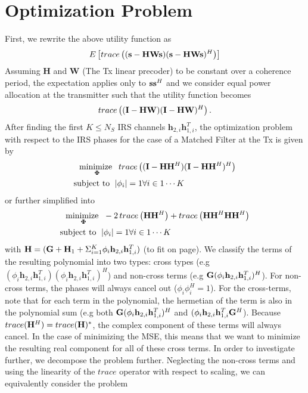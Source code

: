 \documentclass[12pt,a4paper]{report}
\begin{document}
\section{Optimization Problem}
First, we rewrite the above utility function as
	\begin{equation}
E\left[ \mathop{trace}\left((\mathbf{s} - \mathbf{H}\mathbf{W}\mathbf{s})(\mathbf{s} - \mathbf{H}\mathbf{W}\mathbf{s})^H \right)\right]
\end{equation}
Assuming $\mathbf{H}$ and $\mathbf{W}$ (The Tx linear precoder) to be constant over a coherence period, the expectation applies only to $\mathbf{s} \mathbf{s}^H$ 
and we consider equal power allocation at the transmitter such that the utility function becomes
	\begin{equation}
\mathop{trace}\left((\mathbf{I} - \mathbf{H}\mathbf{W})(\mathbf{I} - \mathbf{H}\mathbf{W})^H \right).
\end{equation}
After finding the first $K \leq N_S$ IRS channels $\mathbf{h}_{2,i}\mathbf{h}^T_{1,i}$, the optimization problem with respect to the IRS phases for the case of a Matched Filter at the Tx is given by
	\begin{align}
	    \underset{\boldsymbol{\Phi}}{\text{minimize }}
	    & \; \mathop{trace}\left((\mathbf{I} - \mathbf{H}\mathbf{H}^H)
	   (\mathbf{I} - \mathbf{H}\mathbf{H}^H)^H \right)
	     \\
	    \text{subject to  } \; &
	    | \phi_i | = 1  \forall i \in {1 \cdots	 K}
	\end{align}\label{mse_problem}
	or further simplified into
		\begin{align}
	    \underset{\boldsymbol{\Phi}}{\text{minimize }}
	    & \; - 2 \mathop{trace} \left( \mathbf{H}\mathbf{H}^H\right) + \mathop{trace}\left(\mathbf{H}\mathbf{H}^H \mathbf{H}\mathbf{H}^H\right)
	     \\
	    \text{subject to  } \; &
	    | \phi_i | = 1  \forall i \in {1 \cdots	 K}
	\end{align}\label{mse_problem_s}
	with $\mathbf{H} = (\mathbf{G} +  \mathbf{H}_1 + \Sigma_{i=1}^{K} \phi_i \mathbf{h}_{2,i}\mathbf{h}^T_{1,i})$ (to fit on page).
	We classify the terms of the resulting polynomial into two types:
	cross types (e.g $(\phi_i \mathbf{h}_{2,i}\mathbf{h}^T_{1,i})(\phi_i \mathbf{h}_{2,i}\mathbf{h}^T_{1,i})^H$) and non-cross terms (e.g $\mathbf{G} (\phi_i \mathbf{h}_{2,i}\mathbf{h}^T_{1,i})^H$). For non-cross terms, the phases will always cancel out ($\phi_i \phi_i^H = 1$). For the cross-terms, note that
	for each term in the polynomial, the hermetian of the term is also in the polynomial sum (e.g both $\mathbf{G} (\phi_i \mathbf{h}_{2,i}\mathbf{h}^T_{1,i})^H$ and $ (\phi_i \mathbf{h}_{2,i}\mathbf{h}^T_{1,i}\mathbf{G}^H$). Because $trace(\mathbf{H}^H) = trace(\mathbf{H})^*$, the complex component of these terms will always cancel. In the case of minimizing the MSE, this means that we want to minimize the resulting real component for all of these cross terms. In order to investigate further, we decompose the problem further. Neglecting the non-cross terms and using the linearity of the $trace$ operator with respect to scaling, we can equivalently consider the problem 
\end{document}
